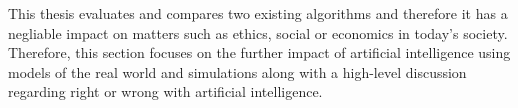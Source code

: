 
This thesis evaluates and compares two existing algorithms and therefore it has
a negliable impact on matters such as ethics, social or economics in today's
society. Therefore, this section focuses on the further impact of artificial
intelligence using models of the real world and simulations along with a
high-level discussion regarding right or wrong with artificial intelligence.

